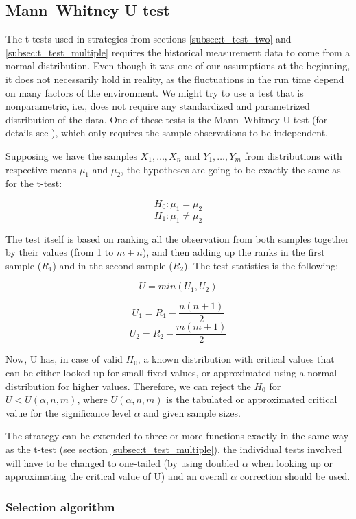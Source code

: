 \subsection{Mann–Whitney U test}
\label{subsec:u_test}

The t-tests used in strategies from sections \ref{subsec:t_test_two} and \ref{subsec:t_test_multiple} requires the historical measurement data to come from a normal distribution. Even though it was one of our assumptions at the beginning, it does not necessarily hold in reality, as the fluctuations in the run time depend on many factors of the environment. We might try to use a test that is nonparametric, i.e., does not require any standardized and parametrized distribution of the data. One of these tests is the Mann–Whitney U test (for details see \cite{weiss_introductory_2010}), which only requires the sample observations to be independent.

Supposing we have the samples $X_1, \dots, X_n$ and $Y_1, \dots, Y_m$ from distributions with respective means $\mu_1$ and $\mu_2$, the hypotheses are going to be exactly the same as for the t-test:

\[
H_0: \mu_1 = \mu_2
\]
\[
H_1: \mu_1 \ne \mu_2
\]

The test itself is based on ranking all the observation from both samples together by their values (from 1 to $m+n$), and then adding up the ranks in the first sample ($R_1$) and in the second sample ($R_2$). The test statistics is the following:

\[U = min(U_1, U_2)\]

\[U_1 = R_1 - \frac{n(n+1)}{2}\]
\[U_2 = R_2 - \frac{m(m+1)}{2}\]

Now, U has, in case of valid $H_0$, a known distribution with critical values that can be either looked up for small fixed values, or approximated using a normal distribution for higher values. Therefore, we can reject the $H_0$ for $U < U(\alpha, n, m)$, where $U(\alpha, n, m)$ is the tabulated or approximated critical value for the significance level $\alpha$ and given sample sizes.

The strategy can be extended to three or more functions exactly in the same way as the t-test (see section \ref{subsec:t_test_multiple}), the individual tests involved will have to be changed to one-tailed (by using doubled $\alpha$ when looking up or approximating the critical value of U) and an overall $\alpha$ correction should be used.

\subsubsection{Selection algorithm}


